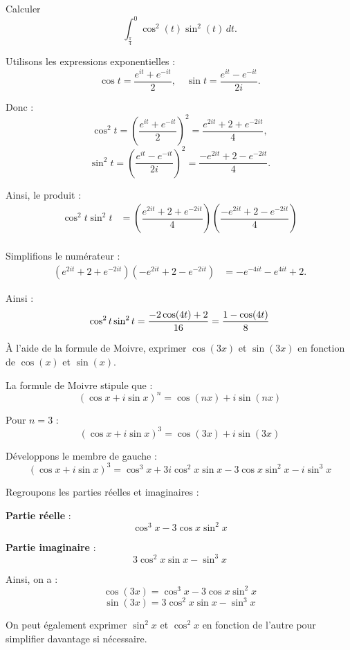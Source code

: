 \documentclass[a4paper,12pt]{article}
\begin{document}
\begin{tcolorbox}[title=Exercice 6 - {[}Calculer{]}]
Calculer
\[
\int_{\frac{\pi}{4}}^{0} \cos^2(t) \sin^2(t) \, dt.
\]
\end{tcolorbox}

\begin{solutionbox}
Utilisons les expressions exponentielles :
\[
\cos t = \dfrac{e^{it} + e^{-it}}{2}, \quad \sin t = \dfrac{e^{it} - e^{-it}}{2i}.
\] 

Donc :
\[
\cos^2 t = \left( \dfrac{e^{it} + e^{-it}}{2} \right)^2 = \dfrac{e^{2it} + 2 + e^{-2it}}{4},
\]
\[
\sin^2 t = \left( \dfrac{e^{it} - e^{-it}}{2i} \right)^2 = \dfrac{-e^{2it} + 2 - e^{-2it}}{4}.
\]

Ainsi, le produit :
\begin{align*}
\cos^2 t \sin^2 t &= \left( \dfrac{e^{2it} + 2 + e^{-2it}}{4} \right) \left( \dfrac{-e^{2it} + 2 - e^{-2it}}{4} \right) \\
\end{align*}

Simplifions le numérateur :
\begin{align*}
(e^{2it} + 2 + e^{-2it})(-e^{2it} + 2 - e^{-2it}) &= -e^{-4it} - e^{4it} +2.
\end{align*}


Ainsi :
$$
    \cos^2t\sin^2t = \dfrac{-2\cos(4t) + 2}{16}\\
    = \dfrac{1 - \cos(4t)}{8}
$$
\end{solutionbox}

\begin{tcolorbox}[title=Exercice 7 - {[}Calculer{]}]
À l’aide de la formule de Moivre, exprimer \( \cos(3x) \) et \( \sin(3x) \) en fonction de \( \cos(x) \) et \( \sin(x) \).
\end{tcolorbox}

\begin{solutionbox}
La formule de Moivre stipule que :
\[
\left( \cos x + i\sin x \right)^n = \cos(nx) + i\sin(nx)
\]

Pour \( n = 3 \) :
\[
\left( \cos x + i\sin x \right)^3 = \cos(3x) + i\sin(3x)
\]

Développons le membre de gauche :
\[
\left( \cos x + i\sin x \right)^3 = \cos^3 x + 3i\cos^2 x \sin x - 3\cos x \sin^2 x - i\sin^3 x
\]

Regroupons les parties réelles et imaginaires :

\textbf{Partie réelle} :
\[
\cos^3 x - 3\cos x \sin^2 x
\]

\textbf{Partie imaginaire} :
\[
3\cos^2 x \sin x - \sin^3 x
\]

Ainsi, on a :
\[
\cos(3x) = \cos^3 x - 3\cos x \sin^2 x
\]
\[
\sin(3x) = 3\cos^2 x \sin x - \sin^3 x
\]

On peut également exprimer \( \sin^2 x \) et \( \cos^2 x \) en fonction de l'autre pour simplifier davantage si nécessaire.
\end{solutionbox}
\end{document}
